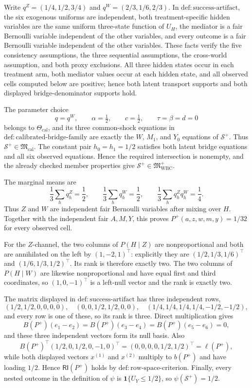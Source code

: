 Write \(q^Z=(1/4,1/2,3/4)\) and
\(q^W=(2/3,1/6,2/3)\).  In
\(\mathrm{def{:}success\text{-}artifact}\), the six exogenous uniforms are
independent, both treatment-specific hidden variables are the same uniform
three-state function of \(U_H\), the mediator is a fair Bernoulli variable
independent of the other variables, and every outcome is a fair Bernoulli
variable independent of the other variables.  These facts verify the five
consistency assumptions, the three sequential assumptions, the cross-world
assumption, and both proxy exclusions.  All three hidden states occur in each
treatment arm, both mediator values occur at each hidden state, and all observed
cells computed below are positive; hence both latent transport supports and both
displayed bridge-denominator supports hold.

The parameter choice
\[
 q=q^W,\qquad \alpha=\tfrac12,\qquad c=\tfrac12,
 \qquad \tau=\beta=d=0
\]
belongs to \(\Theta_{\mathrm{cal}}\), and its three common-shock equations in
\(\mathrm{def{:}calibrated\text{-}bridge\text{-}family}\) are exactly the
\(W\), \(M_1\), and \(Y_0\) equations of \(\mathcal S^+\).  Thus
\(\mathcal S^+\in\mathfrak M_{\mathrm{cal}}\).  The constant pair
\(h_0=h_1=1/2\) satisfies both latent bridge equations and all six observed
equations.  Hence the required intersection is nonempty, and the already checked
member properties give
\(\mathcal S^+\in\mathfrak M_{\mathrm{WBC}}^+\).

The marginal means are
\[
 \frac13\sum_hq_h^Z=\frac12,
 \qquad \frac13\sum_hq_h^W=\frac12,
 \qquad \frac13\sum_hq_h^Zq_h^W=\frac14.
\]
Thus \(Z\) and \(W\) are independent fair Bernoulli variables after mixing over
\(H\).  Together with the independent fair \(A,M,Y\), this proves
\(P^+(a,z,w,m,y)=1/32\) for every observed cell.

For the \(Z\)-channel, the two columns of \(P(H\mid Z)\) are nonproportional and
both are annihilated on the left by \((1,-2,1)^\top\): explicitly they are
\((1/2,1/3,1/6)^\top\) and \((1/6,1/3,1/2)^\top\).  Its rank is therefore exactly
two.  The two columns of \(P(H\mid W)\) are likewise nonproportional and have
equal first and third coordinates, so \((1,0,-1)^\top\) is a left-null vector and
the rank is exactly two.

The matrix displayed in \(\mathrm{def{:}success\text{-}artifact}\) has three
independent rows,
\[
 (1/2,1/2,0,0,0,0),\quad
 (0,0,1/2,1/2,0,0),\quad
 (1/4,1/4,1/4,1/4,-1/2,-1/2),
\]
and every row is one of these, so its rank is three.  Direct multiplication gives
\[
 B(P^+)(e_1-e_2)=B(P^+)(e_3-e_4)=B(P^+)(e_5-e_6)=0,
\]
and these three independent vectors form its null basis.  Also
\[
 B(P^+)^\top(1/2,0,1/2,0,-1,0)^\top
 =(0,0,0,0,1/2,1/2)^\top=\ell(P^+),
\]
while both displayed vectors \(x^{(1)}\) and \(x^{(2)}\) multiply to \(b(P^+)\)
and have loading \(1/2\).  Hence \(\mathsf{RI}(P^+)\) holds by
\(\mathrm{def{:}row\text{-}space\text{-}criterion}\).  Finally, every nested
outcome in the definition of \(\psi\) is
\(\mathbf 1\{U_Y\le1/2\}\), so \(\psi(\mathcal S^+)=1/2\).